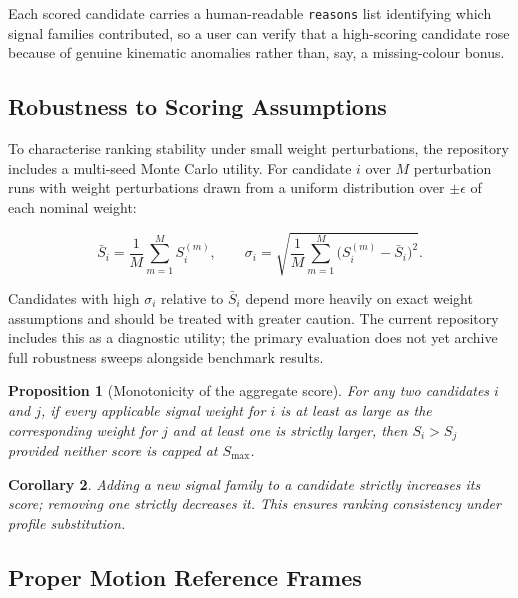 \documentclass[12pt]{elsarticle}
\newtheorem{prop}{Proposition}
\newtheorem{cor}[prop]{Corollary}
\begin{document}
Each scored candidate carries a human-readable \texttt{reasons} list identifying which signal families contributed, so a user can verify that a high-scoring candidate rose because of genuine kinematic anomalies rather than, say, a missing-colour bonus.

\subsection{Robustness to Scoring Assumptions}
\label{sec:robustness}

To characterise ranking stability under small weight perturbations, the repository includes a multi-seed Monte Carlo utility. For candidate $i$ over $M$ perturbation runs with weight perturbations drawn from a uniform distribution over $\pm\epsilon$ of each nominal weight:

\begin{equation}
\bar{S}_i = \frac{1}{M}\sum_{m=1}^{M} S_i^{(m)},
\qquad
\sigma_i = \sqrt{\frac{1}{M}\sum_{m=1}^{M}\bigl(S_i^{(m)} - \bar{S}_i\bigr)^2}.
\label{eq:robustness}
\end{equation}

Candidates with high $\sigma_i$ relative to $\bar{S}_i$ depend more heavily on exact weight assumptions and should be treated with greater caution. The current repository includes this as a diagnostic utility; the primary evaluation does not yet archive full robustness sweeps alongside benchmark results.

\begin{prop}[Monotonicity of the aggregate score]
For any two candidates $i$ and $j$, if every applicable signal weight for $i$ is at least as large as the corresponding weight for $j$ and at least one is strictly larger, then $S_i > S_j$ provided neither score is capped at $S_{\max}$.
\end{prop}
\begin{cor}
Adding a new signal family to a candidate strictly increases its score; removing one strictly decreases it. This ensures ranking consistency under profile substitution.
\end{cor}

\subsection{Proper Motion Reference Frames}
\label{sec:pm}
\end{document}
